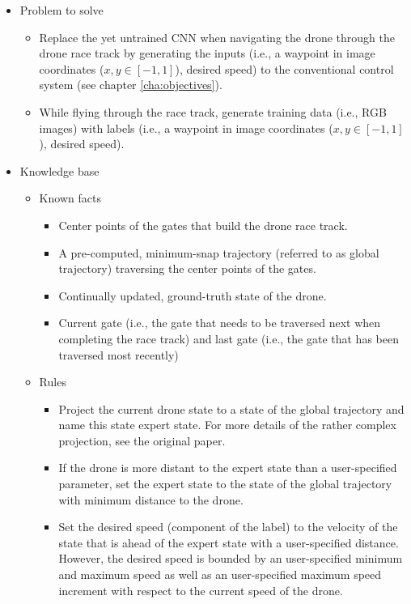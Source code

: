 \begin{itemize}
	\item Problem to solve
	\begin{itemize}
		\item Replace the yet untrained CNN when navigating the drone through the drone race track by
		generating the inputs (i.e., a waypoint in image coordinates ($x, y \in [-1, 1]$), desired speed) 
		to the conventional control system (see chapter \ref{cha:objectives}).
		\item While flying through the race track, 
		generate training data (i.e., RGB images) 
		with labels (i.e., a waypoint in image coordinates ($x, y \in [-1, 1]$), desired speed).
	\end{itemize}
	\item Knowledge base
	\begin{itemize}
		\item Known facts
		\begin{itemize}
			\item Center points of the gates that build the drone race track.
			\item A pre-computed, minimum-snap trajectory (referred to as global trajectory) traversing the center points of the gates.
			\item Continually updated, ground-truth state of the drone.
			\item Current gate (i.e., the gate that needs to be traversed next when completing the race track) 
			and last gate (i.e., the gate that has been traversed most recently)
		\end{itemize}
		\item Rules
		\begin{itemize}
			\item Project the current drone state to a state of the global trajectory and name this state expert state. 
			For more details of the rather complex projection, see the original paper.
			\item If the drone is more distant to the expert state than a user-specified parameter, 
			set the expert state to the state of the global trajectory with minimum distance to the drone.
			\item Set the desired speed (component of the label) to the velocity of the state 
			that is ahead of the expert state with a user-specified distance. 
			However, the desired speed is bounded by an user-specified minimum and maximum speed 
			as well as an user-specified maximum speed increment with respect to the current speed of the drone.

\end{itemize}
\end{itemize}
\end{itemize}
